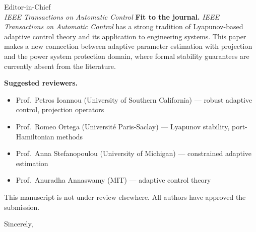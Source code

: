 \documentclass[11pt,a4paper]{letter}
\begin{document}
\begin{letter}{Editor-in-Chief\\
               \textit{IEEE Transactions on Automatic Control}}
\textbf{Fit to the journal.}
\textit{IEEE Transactions on Automatic Control} has a strong tradition
of Lyapunov-based adaptive control theory and its application to
engineering systems.  This paper makes a new connection between
adaptive parameter estimation with projection and the power system
protection domain, where formal stability guarantees are currently
absent from the literature.

\textbf{Suggested reviewers.}
\begin{itemize}
  \item Prof.\ Petros Ioannou (University of Southern California)
        --- robust adaptive control, projection operators
  \item Prof.\ Romeo Ortega (Universit\'{e} Paris-Saclay)
        --- Lyapunov stability, port-Hamiltonian methods
  \item Prof.\ Anna Stefanopoulou (University of Michigan)
        --- constrained adaptive estimation
  \item Prof.\ Anuradha Annaswamy (MIT) --- adaptive control theory
\end{itemize}

This manuscript is not under review elsewhere.
All authors have approved the submission.

\closing{Sincerely,}
\end{letter}
\end{document}
